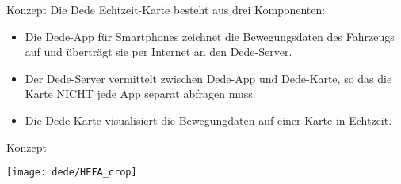 
\begin{frame}{Konzept}
  Die Dede Echtzeit-Karte besteht aus drei Komponenten:
  \begin{itemize}
  \item Die Dede-App für Smartphones zeichnet die Bewegungsdaten des Fahrzeugs auf und überträgt sie per Internet an den Dede-Server.
  \item Der Dede-Server vermittelt zwischen Dede-App und Dede-Karte, so das die Karte NICHT jede App separat abfragen muss.
  \item Die Dede-Karte visualisiert die Bewegungdaten auf einer Karte in Echtzeit.
  \end{itemize}
\end{frame}

\begin{frame}{Konzept}
  \begin{center}
    \texttt{[image: dede/HEFA\_crop]}
  \end{center}
\end{frame}
